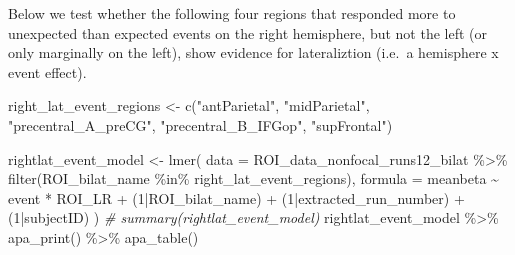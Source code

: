 \documentclass[
]{article}
\newenvironment{Shaded}{\begin{snugshade}}{\end{snugshade}}
\newcommand{\AttributeTok}[1]{\textcolor[rgb]{0.77,0.63,0.00}{#1}}
\newcommand{\CommentTok}[1]{\textcolor[rgb]{0.56,0.35,0.01}{\textit{#1}}}
\newcommand{\DecValTok}[1]{\textcolor[rgb]{0.00,0.00,0.81}{#1}}
\newcommand{\FunctionTok}[1]{\textcolor[rgb]{0.00,0.00,0.00}{#1}}
\newcommand{\NormalTok}[1]{#1}
\newcommand{\OtherTok}[1]{\textcolor[rgb]{0.56,0.35,0.01}{#1}}
\newcommand{\SpecialCharTok}[1]{\textcolor[rgb]{0.00,0.00,0.00}{#1}}
\newcommand{\StringTok}[1]{\textcolor[rgb]{0.31,0.60,0.02}{#1}}
\begin{document}
Below we test whether the following four regions that responded more to
unexpected than expected events on the right hemisphere, but not the
left (or only marginally on the left), show evidence for lateraliztion
(i.e.~a hemisphere x event effect).

\begin{Shaded}
\begin{Highlighting}[]
\NormalTok{right\_lat\_event\_regions }\OtherTok{\textless{}{-}} \FunctionTok{c}\NormalTok{(}\StringTok{"antParietal"}\NormalTok{, }
                       \StringTok{"midParietal"}\NormalTok{,}
                       \StringTok{"precentral\_A\_preCG"}\NormalTok{,}
                       \StringTok{"precentral\_B\_IFGop"}\NormalTok{,}
                       \StringTok{"supFrontal"}\NormalTok{)}

\NormalTok{rightlat\_event\_model }\OtherTok{\textless{}{-}} \FunctionTok{lmer}\NormalTok{(}
      \AttributeTok{data =}\NormalTok{ ROI\_data\_nonfocal\_runs12\_bilat }\SpecialCharTok{\%\textgreater{}\%}
        \FunctionTok{filter}\NormalTok{(ROI\_bilat\_name }\SpecialCharTok{\%in\%}\NormalTok{ right\_lat\_event\_regions),}
      \AttributeTok{formula =}\NormalTok{ meanbeta }\SpecialCharTok{\textasciitilde{}}\NormalTok{ event }\SpecialCharTok{*}\NormalTok{ ROI\_LR }\SpecialCharTok{+}\NormalTok{ (}\DecValTok{1}\SpecialCharTok{|}\NormalTok{ROI\_bilat\_name) }\SpecialCharTok{+}\NormalTok{ (}\DecValTok{1}\SpecialCharTok{|}\NormalTok{extracted\_run\_number) }\SpecialCharTok{+}\NormalTok{ (}\DecValTok{1}\SpecialCharTok{|}\NormalTok{subjectID)}
\NormalTok{    )}
\CommentTok{\# summary(rightlat\_event\_model)}
\NormalTok{rightlat\_event\_model }\SpecialCharTok{\%\textgreater{}\%}
  \FunctionTok{apa\_print}\NormalTok{() }\SpecialCharTok{\%\textgreater{}\%}
  \FunctionTok{apa\_table}\NormalTok{()}
\end{Highlighting}
\end{Shaded}
\end{document}
